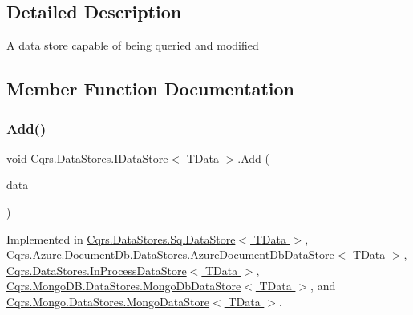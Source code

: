 \subsection{Detailed Description}
A data store capable of being queried and modified 



\subsection{Member Function Documentation}
\mbox{\label{interfaceCqrs_1_1DataStores_1_1IDataStore_a114404daaf37fec9cc5547cd9a17858c_a114404daaf37fec9cc5547cd9a17858c}} 
\subsubsection{\texorpdfstring{Add()}{Add()}\hspace{0.1cm}{\footnotesize\ttfamily [1/2]}}
{\footnotesize\ttfamily void \hyperlink{interfaceCqrs_1_1DataStores_1_1IDataStore}{Cqrs.\+Data\+Stores.\+I\+Data\+Store}$<$ T\+Data $>$.Add (\begin{DoxyParamCaption}\item[{T\+Data}]{data }\end{DoxyParamCaption})}



Implemented in \hyperlink{classCqrs_1_1DataStores_1_1SqlDataStore_abcca53d2e93dbdfb193a9fb0996849c5_abcca53d2e93dbdfb193a9fb0996849c5}{Cqrs.\+Data\+Stores.\+Sql\+Data\+Store$<$ T\+Data $>$}, \hyperlink{classCqrs_1_1Azure_1_1DocumentDb_1_1DataStores_1_1AzureDocumentDbDataStore_ad17e6e846430e617af24be48b77d1528_ad17e6e846430e617af24be48b77d1528}{Cqrs.\+Azure.\+Document\+Db.\+Data\+Stores.\+Azure\+Document\+Db\+Data\+Store$<$ T\+Data $>$}, \hyperlink{classCqrs_1_1DataStores_1_1InProcessDataStore_ade5c4033c628598665c0cba986a54c15_ade5c4033c628598665c0cba986a54c15}{Cqrs.\+Data\+Stores.\+In\+Process\+Data\+Store$<$ T\+Data $>$}, \hyperlink{classCqrs_1_1MongoDB_1_1DataStores_1_1MongoDbDataStore_affcb1268469b99963501dd8c58e4a480_affcb1268469b99963501dd8c58e4a480}{Cqrs.\+Mongo\+D\+B.\+Data\+Stores.\+Mongo\+Db\+Data\+Store$<$ T\+Data $>$}, and \hyperlink{classCqrs_1_1Mongo_1_1DataStores_1_1MongoDataStore_a27bcfb40fe8203e09d320b2aa19fff3a_a27bcfb40fe8203e09d320b2aa19fff3a}{Cqrs.\+Mongo.\+Data\+Stores.\+Mongo\+Data\+Store$<$ T\+Data $>$}.

